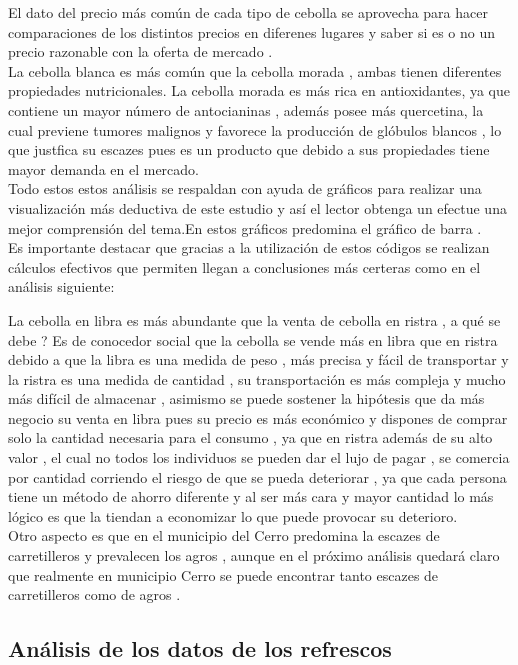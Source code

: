 \documentclass[twocolumn,12pt]{article}
\begin{document}
El dato del precio más común de cada tipo de cebolla se aprovecha para hacer comparaciones de los distintos precios en diferenes lugares y saber si es o no un precio razonable con la oferta de mercado .\\

La cebolla blanca es más común que la cebolla morada , ambas tienen diferentes propiedades nutricionales. La cebolla morada es más rica en antioxidantes, ya que contiene un mayor número de antocianinas , además posee más quercetina, la cual previene tumores malignos y favorece la producción de glóbulos blancos , lo que justfica su escazes pues es un producto que debido a sus propiedades tiene mayor demanda en el mercado.\\

Todo estos estos análisis se respaldan con ayuda de gráficos para realizar una visualización más deductiva de este estudio y así el lector obtenga un efectue una mejor comprensión del tema.En estos gráficos predomina el gráfico de barra .\\

Es importante destacar que gracias a la utilización de estos códigos se realizan cálculos efectivos que permiten llegan a conclusiones más certeras como en el análisis siguiente:

La cebolla en libra es más abundante que la venta de cebolla en ristra , a qué se debe ? Es de conocedor social que la cebolla se vende más en libra que en ristra debido a que la libra es una medida de peso , más precisa y fácil de transportar y la ristra es una medida de cantidad , su transportación es más compleja y mucho más difícil de almacenar , asimismo se puede sostener la hipótesis que da más negocio su venta en libra pues su precio es más económico y dispones de comprar solo la cantidad necesaria para el consumo , ya que en ristra además de su alto valor , el cual no todos los individuos se pueden dar el lujo de pagar , se comercia por cantidad corriendo el riesgo de que se pueda deteriorar , ya que cada persona tiene un método de ahorro diferente y al ser más cara y mayor cantidad lo más lógico es que la tiendan a economizar lo que puede provocar su deterioro.\\

Otro aspecto es que en el municipio del Cerro predomina la escazes de carretilleros y prevalecen los agros , aunque en el próximo análisis quedará claro que realmente en municipio  Cerro se puede encontrar tanto escazes de carretilleros como de agros .

\subsection{Análisis de los datos de los refrescos}
\end{document}
